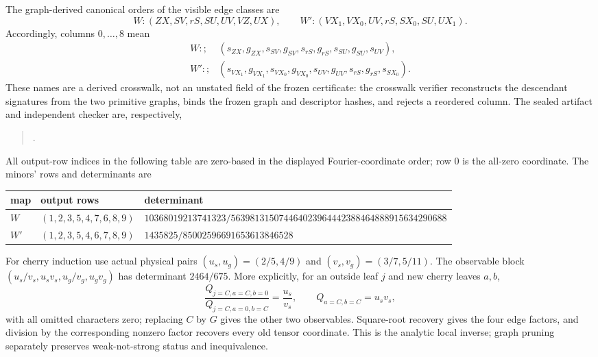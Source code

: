 \documentclass[11pt]{article}
\theoremstyle{remark}
\begin{document}
The graph-derived canonical orders of the visible edge classes are
\[
 W:(ZX,SV,rS,SU,UV,VZ,UX),\qquad
 W':(VX_1,VX_0,UV,rS,SX_0,SU,UX_1).
\]
Accordingly, columns \(0,\ldots,8\) mean
\[
 \begin{aligned}
 W:;&(s_{ZX},g_{ZX},s_{SV},g_{SV},s_{rS},g_{rS},
       s_{SU},g_{SU},s_{UV}),\\
 W':;&(s_{VX_1},g_{VX_1},s_{VX_0},g_{VX_0},s_{UV},g_{UV},
       s_{rS},g_{rS},s_{SX_0}).
 \end{aligned}
\]
These names are a derived crosswalk, not an unstated field of the frozen
certificate: the crosswalk verifier reconstructs the descendant signatures
from the two primitive graphs, binds the frozen graph and descriptor hashes,
and rejects a reordered column.  The sealed artifact and independent checker
are, respectively,
\begin{quote}\small
{}\par
{}.
\end{quote}
All output-row indices in the following table are zero-based in the displayed
Fourier-coordinate order; row \(0\) is the all-zero coordinate.  The minors'
rows and determinants are
\begin{center}
\small
\begin{tabular}{lll}
\toprule
map & output rows & determinant\\
\midrule
\(W\) & \((1,2,3,5,4,7,6,8,9)\)
& \(10368019213741323/
563981315074464023964442388464888915634290688\)\\
\(W'\) & \((1,2,3,5,4,6,7,8,9)\)
& \(1435825/85002596691653613846528\)\\
\bottomrule
\end{tabular}
\end{center}

For cherry induction use actual physical pairs
\((u_s,u_g)=(2/5,4/9)\) and \((v_s,v_g)=(3/7,5/11)\).  The observable block
\((u_s/v_s,u_sv_s,u_g/v_g,u_gv_g)\) has determinant \(2464/675\).  More
explicitly, for an outside leaf \(j\) and new cherry leaves \(a,b\),
\[
 \frac{Q_{j=C,a=C,b=0}}{Q_{j=C,a=0,b=C}}=\frac{u_s}{v_s},
 \qquad Q_{a=C,b=C}=u_sv_s,
\]
with all omitted characters zero; replacing \(C\) by \(G\) gives the other
two observables.  Square-root recovery gives the four edge factors, and
division by the corresponding nonzero factor recovers every old tensor
coordinate.  This is the analytic local inverse; graph pruning separately
preserves weak-not-strong status and inequivalence.
\end{document}
